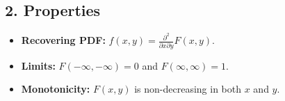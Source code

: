 \documentclass[12pt]{article}
\begin{document}
\subsection*{2. Properties}
\begin{itemize}
    \item \textbf{Recovering PDF:} $f(x,y) = \frac{\partial^2}{\partial x \partial y} F(x,y)$.
    \item \textbf{Limits:} $F(-\infty, -\infty) = 0$ and $F(\infty, \infty) = 1$.
    \item \textbf{Monotonicity:} $F(x,y)$ is non-decreasing in both $x$ and $y$.
\end{itemize}
\end{document}
